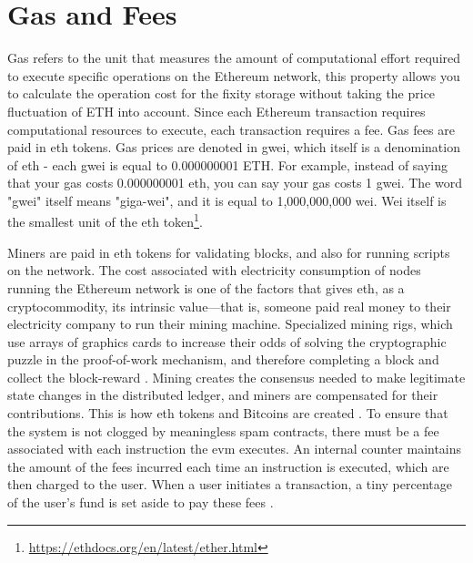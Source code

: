 \section{Gas and Fees}
\label{sec:costs}
Gas refers to the unit that measures the amount of computational effort required to execute specific operations on the Ethereum network, this property allows you to calculate the operation cost for the fixity storage without taking the price fluctuation of ETH into account. Since each Ethereum transaction requires computational resources to execute, each transaction requires a fee.
Gas fees are paid in \acrlong{eth} tokens. Gas prices are denoted in \acrlong{gwei}, which itself is a denomination of \acrshort{eth} - each \acrshort{gwei} is equal to 0.000000001 ETH. For example, instead of saying that your gas costs 0.000000001 \acrlong{eth}, you can say your gas costs 1 \acrlong{gwei}. The word "\acrlong{gwei}" itself means "giga-wei", and it is equal to 1,000,000,000 wei. Wei itself is the smallest unit of the \acrlong{eth} token\footnote{\url{https://ethdocs.org/en/latest/ether.html}}.

Miners are paid in \acrlong{eth} tokens for validating blocks, and also for running scripts on the network. The cost associated with electricity consumption of nodes running the Ethereum network is one of the factors that gives \acrlong{eth}, as a cryptocommodity, its intrinsic value—that is, someone paid real money to their electricity company to run their mining machine. Specialized mining rigs, which use arrays of graphics cards to increase their odds of solving the cryptographic puzzle in the proof-of-work mechanism, and therefore completing a block and collect the block-reward \cite[12]{dannen2017introducing}. 
Mining creates the consensus needed to make legitimate state changes in the distributed ledger, and miners are compensated for their contributions. This is how \acrlong{eth} tokens and Bitcoins are created \cite[57]{dannen2017introducing}. 
To ensure that the system is not clogged by meaningless spam contracts, there must be a fee associated with each instruction the \acrshort{evm} executes. An internal counter maintains the amount of the fees incurred each time an instruction is executed, which are then charged to the user. When a user initiates a \gls{transaction}, a tiny percentage of the user's fund is set aside to pay these fees \cite[58]{dannen2017introducing}. 

